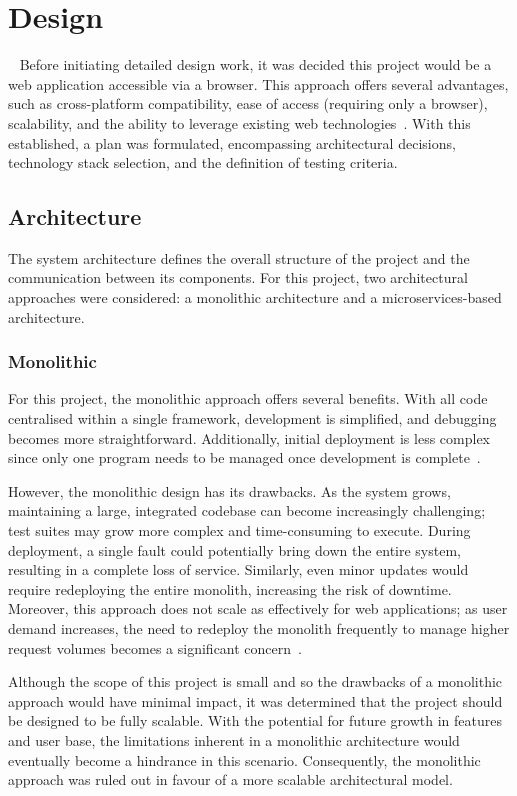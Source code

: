 \chapter{Design}~\label{cha:design}
Before initiating detailed design work, it was decided this project would be a web application accessible via a browser. This approach offers several advantages, such as cross-platform compatibility, ease of access (requiring only a browser), scalability, and the ability to leverage existing web technologies~\cite{6822300}. With this established, a plan was formulated, encompassing architectural decisions, technology stack selection, and the definition of testing criteria.

\section{Architecture}
The system architecture defines the overall structure of the project and the communication between its components. For this project, two architectural approaches were considered: a monolithic architecture and a microservices-based architecture.

\subsection{Monolithic}
For this project, the monolithic approach offers several benefits. With all code centralised within a single framework, development is simplified, and debugging becomes more straightforward. Additionally, initial deployment is less complex since only one program needs to be managed once development is complete~\cite{9109514}.

However, the monolithic design has its drawbacks. As the system grows, maintaining a large, integrated codebase can become increasingly challenging; test suites may grow more complex and time-consuming to execute. During deployment, a single fault could potentially bring down the entire system, resulting in a complete loss of service. Similarly, even minor updates would require redeploying the entire monolith, increasing the risk of downtime. Moreover, this approach does not scale as effectively for web applications; as user demand increases, the need to redeploy the monolith frequently to manage higher request volumes becomes a significant concern~\cite{9109514}.

Although the scope of this project is small and so the drawbacks of a monolithic approach would have minimal impact, it was determined that the project should be designed to be fully scalable. With the potential for future growth in features and user base, the limitations inherent in a monolithic architecture would eventually become a hindrance in this scenario. Consequently, the monolithic approach was ruled out in favour of a more scalable architectural model.

